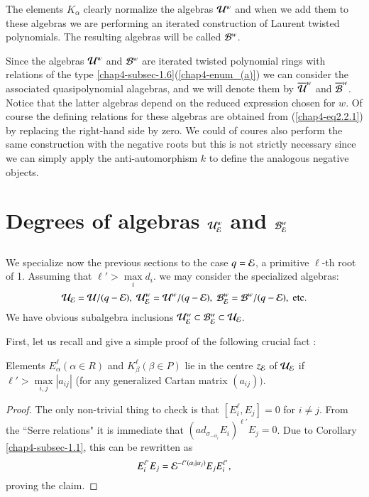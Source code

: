 \noindent
The elements $K_{\alpha}$ clearly normalize the algebras $\mathcal{U}^{w}$ and when we add them to these algebras we are performing an iterated construction of Laurent twisted polynomials. The resulting algebras will be called $\mathcal{B}^{w}$.

Since the algebras $\mathcal{U}^{w}$ and $\mathcal{B}^{w}$ are iterated twisted polynomial rings with relations of the type \ref{chap4-subsec-1.6}(\ref{chap4-enum_(a)}) we can consider the associated quasipolynomial alagebras, and we will denote them by $\overline{\mathcal{U}}^{w}$ and $\overline{\mathcal{B}}^{w}$. Notice that the latter algebras depend on the reduced expression chosen for $w$. Of course the defining relations for these algebras are obtained from (\ref{chap4-eq2.2.1}) by replacing the right-hand side by zero. We could of coures also perform the same construction with the negative roots but this is not strictly necessary since we can simply apply the anti-automorphism $k$ to define the analogous negative objects.

\section{Degrees of algebras $\mathcal{U}_{\mathcal{E}}^{w}$ and $\mathcal{B}_{\mathcal{E}}^{w}$}\label{chap4-sec-3}

\subsection{}\label{chap4-subsec-3.1}
We specialize now the previous sections to the case $q=\mathcal{E}$, a primitive $\ell$-th root of 1. Assuming that $\ell' > \max\limits_{i} d_{i}$. we may consider the specialized algebras:
$$
\mathcal{U}_{\mathcal{E}} = \mathcal{U}/(q-\mathcal{E}), \; \mathcal{U}_{\mathcal{E}}^{w} = \mathcal{U}^{w}/(q-\mathcal{E}), \; \mathcal{B}_{\mathcal{E}}^{w} = \mathcal{B}^{w}/(q-\mathcal{E}), \;{\rm etc}.
$$
We have obvious subalgebra inclusions $\mathcal{U}_{\mathcal{E}}^{w} \subset \mathcal{B}_{\mathcal{E}}^{w} \subset \mathcal{U}_{\mathcal{E}}$.

First, let us recall and give a simple proof of the following crucial fact \cite{chap4-keyDK1}:

\begin{prop*}
Elements $E_{\alpha}^{\ell}(\alpha \in R)$ and $K_{\beta}^{\ell}(\beta\in P)$ lie in the centre $z_{\mathcal{E}}$ of $\mathcal{U}_{\mathcal{E}}$ if $\ell'> \max\limits_{i,j} |a_{ij}|$ (for any generalized Cartan matrix $(a_{ij}))$.
\end{prop*}

\begin{proof}
The only non-trivial thing to check is that $[E_{i}^\ell, E_{j}]= 0$ for $i \neq j$. From the ``Serre relations" it is immediate that $(ad_{\sigma_{-\alpha_{i}}}E_{i})^{\ell'}E_{j} =0$. Due to Corollary \ref{chap4-subsec-1.1}, this can be rewritten as
$$
E_{i}^{\ell'}E_{j}=\mathcal{E}^{-\ell'(\alpha_{i} | \alpha_{j})}E_{j}E_{i}^{\ell'},
$$
proving the claim. 
\end{proof}

